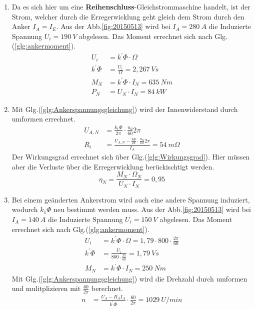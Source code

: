 \begin{solution}
\begin{enumerate}
\item Da es sich hier um eine \textbf{Reihenschluss}-Gleichstrommaschine handelt, ist der Strom, welcher durch die Erregerwicklung geht gleich dem Strom durch den Anker $I_A=I_E$. Aus der Abb.\ref{fig:20150513} wird bei $I_A= 280~A$ die Induzierte Spannung $U_i= 190~V$ abgelesen. Das Moment errechnet sich nach Glg.(\ref{glg:ankermoment}).
\begin{align}
U_i &= k^{'} \Phi \cdot \Omega\\
k^{'} \Phi &= \frac{U_i}{\Omega} = 2,267~Vs\\
M_N &= k^{'} \Phi \cdot I_N = 635~Nm\\
P_N &= U_N \cdot I_N =  84~kW
\end{align}
\item Mit Glg.(\ref{glg:Ankerspannungsgleichung}) wird der Innenwiderstand durch umformen errechnet.\\
\begin{align}
U_{A,N} &= \frac{k_1 \Phi}{2 \pi} \cdot \frac{n_0}{60} 2 \pi\\
R_i &= \frac{U_{A,N} - \frac{k \Phi}{2 \pi} \cdot \frac{n_N}{60} 2 \pi}{I_A}=54~m \Omega
\end{align}
Der Wirkungsgrad errechnet sich über Glg.(\ref{glg:Wirkungsgrad}). Hier müssen aber die Verluste über die Erregerwicklung berückischtigt werden.
\begin{equation}
\eta_N = \frac{M_N \cdot \Omega_N}{U_N \cdot I_N} =0,95
\end{equation}
\item Bei einem geänderten Ankerstrom wird auch eine andere Spannung induziert, wodurch $k_1 \Phi$ neu bestimmt werden muss. Aus der Abb.\ref{fig:20150513} wird bei $I_A= 140~A$ die Induzierte Spannung $U_i= 150~V$ abgelesen. Das Moment errechnet sich nach Glg.(\ref{glg:ankermoment}).
\begin{align}
	U_i &= k^{'} \Phi \cdot \Omega = 1,79 \cdot 800 \cdot \frac{2 \pi}{60}\\
	k^{'} \Phi &= \frac{U_i}{800 \cdot \frac{2 \pi}{60}} = 1,79~Vs\\
M_N &= k^{'} \Phi \cdot I_N = 250~Nm
\end{align}
Mit Glg.(\ref{glg:Ankerspannungsgleichung}) wird die Drehzahl durch umformen und mulitplizieren mit $\frac{60}{2 \pi}$ berechnet.
\begin{align}
n&= \frac{U_A - R_A I_A}{k^{'} \Phi} \cdot \frac{60}{2 \pi} = 1029~U/min

\end{align}
\end{enumerate}
\end{solution}
